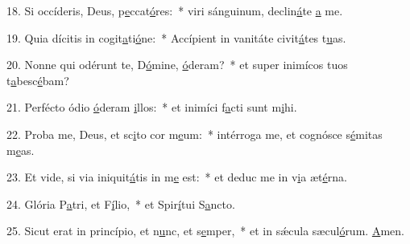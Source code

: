 18. Si occíderis, Deus, p\uline{e}ccat\uline{ó}res:~* viri sánguinum, declin\uline{á}te \uline{a} me.\par 
19. Quia dícitis in cogit\uline{a}ti\uline{ó}ne:~* Accípient in vanitáte civit\uline{á}tes t\uline{u}as.\par 
20. Nonne qui odérunt te, D\uline{ó}mine, \uline{ó}deram?~* et super inimícos tuos t\uline{a}besc\uline{é}bam?\par 
21. Perfécto ódio \uline{ó}deram \uline{i}llos:~* et inimíci f\uline{a}cti sunt m\uline{i}hi.\par 
22. Proba me, Deus, et sc\uline{i}to cor m\uline{e}um:~* intérroga me, et cognósce s\uline{é}mitas m\uline{e}as.\par 
23. Et vide, si via iniquit\uline{á}tis in m\uline{e} est:~* et deduc me in v\uline{i}a æt\uline{é}rna.\par 
24. Glória P\uline{a}tri, et F\uline{í}lio,~* et Spir\uline{í}tui S\uline{a}ncto.\par 
25. Sicut erat in princípio, et n\uline{u}nc, et s\uline{e}mper,~* et in sǽcula sæcul\uline{ó}rum. \uline{A}men.\par 
